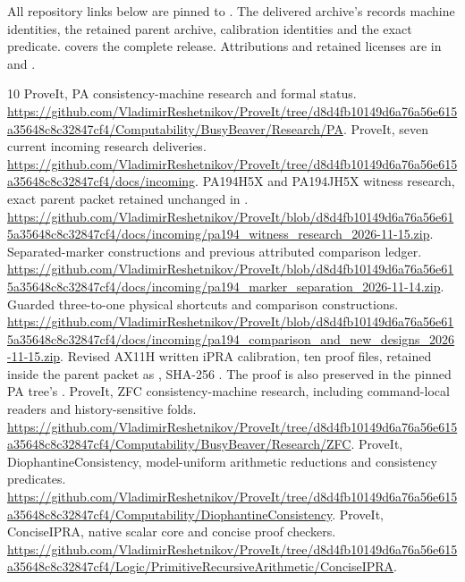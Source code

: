 All repository links below are pinned to
.
The delivered archive's  records machine identities,
the retained parent archive, calibration identities and the exact predicate.
 covers the complete release. Attributions and retained
licenses are in  and .

\begin{thebibliography}{10}
 ProveIt, PA consistency-machine research and formal status.
\url{https://github.com/VladimirReshetnikov/ProveIt/tree/d8d4fb10149d6a76a56e615a35648c8c32847cf4/Computability/BusyBeaver/Research/PA}.
 ProveIt, seven current incoming research deliveries.
\url{https://github.com/VladimirReshetnikov/ProveIt/tree/d8d4fb10149d6a76a56e615a35648c8c32847cf4/docs/incoming}.
 PA194H5X and PA194JH5X witness research, exact parent packet retained unchanged in .
\url{https://github.com/VladimirReshetnikov/ProveIt/blob/d8d4fb10149d6a76a56e615a35648c8c32847cf4/docs/incoming/pa194_witness_research_2026-11-15.zip}.
 Separated-marker constructions and previous attributed comparison ledger.
\url{https://github.com/VladimirReshetnikov/ProveIt/blob/d8d4fb10149d6a76a56e615a35648c8c32847cf4/docs/incoming/pa194_marker_separation_2026-11-14.zip}.
 Guarded three-to-one physical shortcuts and comparison constructions.
\url{https://github.com/VladimirReshetnikov/ProveIt/blob/d8d4fb10149d6a76a56e615a35648c8c32847cf4/docs/incoming/pa194_comparison_and_new_designs_2026-11-15.zip}.
 Revised AX11H written iPRA calibration, ten proof files,
retained inside the parent packet as
, SHA-256
.
The proof is also preserved in the pinned PA tree's
.
 ProveIt, ZFC consistency-machine research, including command-local readers and history-sensitive folds.
\url{https://github.com/VladimirReshetnikov/ProveIt/tree/d8d4fb10149d6a76a56e615a35648c8c32847cf4/Computability/BusyBeaver/Research/ZFC}.
 ProveIt, DiophantineConsistency, model-uniform arithmetic reductions and consistency predicates.
\url{https://github.com/VladimirReshetnikov/ProveIt/tree/d8d4fb10149d6a76a56e615a35648c8c32847cf4/Computability/DiophantineConsistency}.
 ProveIt, ConciseIPRA, native scalar core and concise proof checkers.
\url{https://github.com/VladimirReshetnikov/ProveIt/tree/d8d4fb10149d6a76a56e615a35648c8c32847cf4/Logic/PrimitiveRecursiveArithmetic/ConciseIPRA}.
\end{thebibliography}
